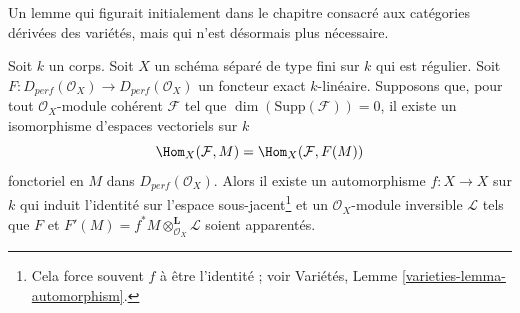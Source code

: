 \noindent
Un lemme qui figurait initialement dans le chapitre consacré aux catégories
dérivées des variétés, mais qui n'est désormais plus nécessaire.

\begin{lemma}
\label{lemma-preserves-Coh}
Soit $k$ un corps. Soit $X$ un schéma séparé de type fini sur $k$ qui est
régulier. Soit $F : D_{perf}(\mathcal{O}_X) \to D_{perf}(\mathcal{O}_X)$
un foncteur exact $k$-linéaire. Supposons que, pour tout
$\mathcal{O}_X$-module cohérent $\mathcal{F}$ tel que
$\dim(\text{Supp}(\mathcal{F})) = 0$, il existe un isomorphisme d'espaces
vectoriels sur $k$
$$
\Hom_X(\mathcal{F}, M) = \Hom_X(\mathcal{F}, F(M))
$$
fonctoriel en $M$ dans $D_{perf}(\mathcal{O}_X)$. Alors il existe un
automorphisme $f : X \to X$ sur $k$ qui induit l'identité sur l'espace
sous-jacent\footnote{Cela force souvent $f$ à être l'identité ;
voir Variétés, Lemme \ref{varieties-lemma-automorphism}.}
et un $\mathcal{O}_X$-module inversible $\mathcal{L}$ tels que $F$ et
$F'(M) = f^*M \otimes_{\mathcal{O}_X}^\mathbf{L} \mathcal{L}$ soient
apparentés.
\end{lemma}


